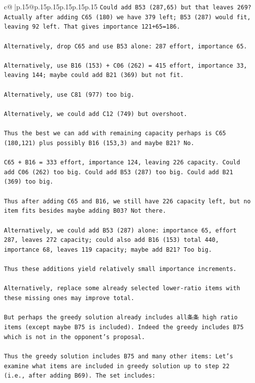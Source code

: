 \documentclass{article}
\begin{document}
{\begin{supertabular}{c@{$\;$}|p{.15\linewidth}@{}p{.15\linewidth}p{.15\linewidth}p{.15\linewidth}p{.15\linewidth}p{.15\linewidth}}
{{{\texttt{Could add B53 (287,65) but that leaves 269? Actually after adding C65 (180) we have 379 left; B53 (287) would fit, leaving 92 left. That gives importance 121+65=186.} \\
\\ 
\texttt{Alternatively, drop C65 and use B53 alone: 287 effort, importance 65.} \\
\\ 
\texttt{Alternatively, use B16 (153) + C06 (262) = 415 effort, importance 33, leaving 144; maybe could add B21 (369) but not fit.} \\
\\ 
\texttt{Alternatively, use C81 (977) too big.} \\
\\ 
\texttt{Alternatively, we could add C12 (749) but overshoot.} \\
\\ 
\texttt{Thus the best we can add with remaining capacity perhaps is C65 (180,121) plus possibly B16 (153,3) and maybe B21? No.} \\
\\ 
\texttt{C65 + B16 = 333 effort, importance 124, leaving 226 capacity. Could add C06 (262) too big. Could add B53 (287) too big. Could add B21 (369) too big.} \\
\\ 
\texttt{Thus after adding C65 and B16, we still have 226 capacity left, but no item fits besides maybe adding B03? Not there.} \\
\\ 
\texttt{Alternatively, we could add B53 (287) alone: importance 65, effort 287, leaves 272 capacity; could also add B16 (153) total 440, importance 68, leaves 119 capacity; maybe add B21? Too big.} \\
\\ 
\texttt{Thus these additions yield relatively small importance increments.} \\
\\ 
\texttt{Alternatively, replace some already selected lower{-}ratio items with these missing ones may improve total.} \\
\\ 
\texttt{But perhaps the greedy solution already includes all条条 high ratio items (except maybe B75 is included). Indeed the greedy includes B75 which is not in the opponent's proposal.} \\
\\ 
\texttt{Thus the greedy solution includes B75 and many other items: Let's examine what items are included in greedy solution up to step 22 (i.e., after adding B69). The set includes:} \\
}}}
\end{supertabular}}
\end{document}
